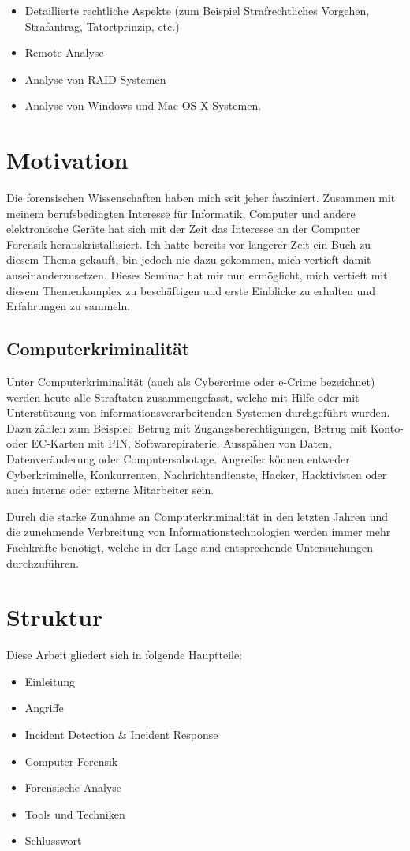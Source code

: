 \begin{itemize}
\item Detaillierte rechtliche Aspekte (zum Beispiel Strafrechtliches Vorgehen, Strafantrag, Tatortprinzip, etc.)
\item Remote-Analyse
\item Analyse von RAID-Systemen
\item Analyse von Windows und Mac OS X Systemen.
\end{itemize}

\section{Motivation}
Die forensischen Wissenschaften haben mich seit jeher fasziniert. Zusammen mit meinem berufsbedingten Interesse für Informatik, Computer und andere elektronische Geräte hat sich mit der Zeit das Interesse an der Computer Forensik herauskristallisiert. Ich hatte bereits vor längerer Zeit ein Buch zu diesem Thema gekauft, bin jedoch nie dazu gekommen, mich vertieft damit auseinanderzusetzen. Dieses Seminar hat mir nun ermöglicht, mich vertieft mit diesem Themenkomplex zu beschäftigen und erste Einblicke zu erhalten und Erfahrungen zu sammeln.

\subsection{Computerkriminalität}
Unter Computerkriminalität (auch als Cybercrime oder e-Crime bezeichnet) werden heute alle Straftaten zusammengefasst, welche mit Hilfe oder mit Unterstützung von informationsverarbeitenden Systemen durchgeführt wurden. Dazu zählen zum Beispiel: Betrug mit Zugangsberechtigungen, Betrug mit Konto- oder EC-Karten mit PIN, Softwarepiraterie, Ausspähen von Daten, Datenveränderung oder Computersabotage. Angreifer können entweder Cyberkriminelle, Konkurrenten, Nachrichtendienste, Hacker, Hacktivisten oder auch interne oder externe Mitarbeiter sein.

Durch die starke Zunahme an Computerkriminalität in den letzten Jahren und die zunehmende Verbreitung von Informationstechnologien werden immer mehr Fachkräfte benötigt, welche in der Lage sind entsprechende Untersuchungen durchzuführen.

\section{Struktur}
Diese Arbeit gliedert sich in folgende Hauptteile:
\begin{itemize}
\item Einleitung
\item Angriffe
\item Incident Detection \& Incident Response
\item Computer Forensik
\item Forensische Analyse
\item Tools und Techniken
\item Schlusswort
\end{itemize}

